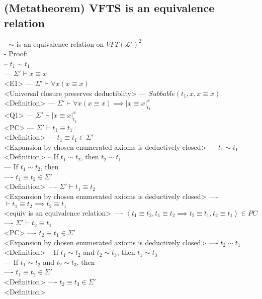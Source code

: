 \documentclass{book}
\newcommand{\seq}[1]{\left\langle #1 \right\rangle}
\newcommand{\sub}[3]{\left|#1\right|_{#3}^{#2}}
\begin{document}
\subsection{(Metatheorem) VFTS is an equivalence relation} %
	- $\sim$ is an equivalence relation on $VFT(\mathcal{L}')^2$ \\
	- Proof: \\
		-- $t_1 \sim t_1$ \\
			--- $\Sigma' \vdash x \equiv x$ \\ <E1>
			--- $\Sigma' \vdash \forall x (x \equiv x)$ \\ <Universal closure preserves deductiblity>
			--- $Subbable(t_1, x, x \equiv x)$ \\ <Definition>
			--- $\Sigma' \vdash \forall x (x \equiv x) \implies \sub{x \equiv x}{x}{t_1}$ \\ <Q1>
			--- $\Sigma' \vdash \sub{x \equiv x}{x}{t_1}$ \\ <PC>
			--- $\Sigma' \vdash t_1 \equiv t_1$ \\ <Definition>
			--- $t_1 \equiv t_1 \in \Sigma'$ \\ <Expansion by chosen enumerated axioms is deductively closed>
			--- $t_1 \sim t_1$ \\ <Definition>
		-- If $t_1 \sim t_2$, then $t_2 \sim t_1$ \\
			--- If $t_1 \sim t_2$, then \\
				---- $t_1 \equiv t_2 \in \Sigma'$ \\ <Definition>
				---- $\Sigma' \vdash t_1 \equiv t_2$ \\ <Expansion by chosen enumerated axioms is deductively closed>
				---- $\vdash t_1 \equiv t_2 \implies t_2 \equiv t_1$ \\ <equiv is an equivalence relation>
				---- $\seq{t_1 \equiv t_2, t_1 \equiv t_2 \implies t_2 \equiv t_1, t_2 \equiv t_1} \in PC$ \\
				---- $\Sigma' \vdash t_2 \equiv t_1$ \\ <PC>
				---- $t_2 \equiv t_1 \in \Sigma'$ \\ <Expansion by chosen enumerated axioms is deductively closed>
				---- $t_2 \sim t_1$ \\ <Definition>
		-- If $t_1 \sim t_2$ and $t_2 \sim t_3$, then $t_1 \sim t_3$ \\
			--- If $t_1 \sim t_2$ and $t_2 \sim t_3$, then \\
				---- $t_1 \equiv t_2 \in \Sigma'$ \\ <Definition>
				---- $t_2 \equiv t_3 \in \Sigma'$ \\ <Definition>
\end{document}
